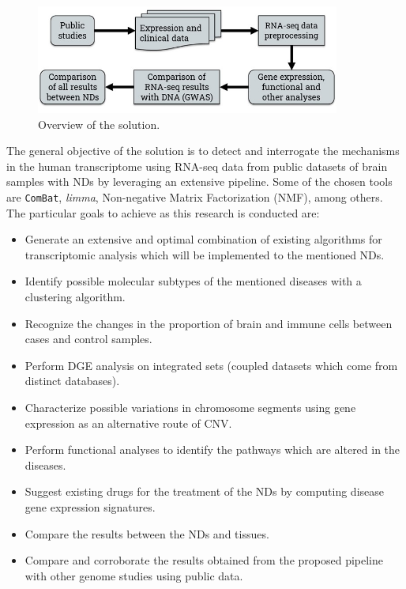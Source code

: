 \begin{figure}[h]
    \centerline{\includegraphics[width = 10cm]{Figures/overview.jpg}}
\caption{Overview of the solution.}
\label{fig:solution-overview}
\end{figure}

The general objective of the solution is to detect and interrogate the mechanisms in the human transcriptome using RNA-seq data from public datasets of brain samples with NDs by leveraging an extensive pipeline. Some of the chosen tools are \verb|ComBat|, \textit{limma}, Non-negative Matrix Factorization (NMF), among others. The particular goals to achieve as this research is conducted are:

\begin{itemize}
\item{Generate an extensive and optimal combination of existing algorithms for transcriptomic analysis which will be implemented to the mentioned NDs.}
\item{Identify possible molecular subtypes of the mentioned diseases with a clustering algorithm.}
\item{Recognize the changes in the proportion of brain and immune cells between cases and control samples.}
\item{Perform DGE analysis on integrated sets (coupled datasets which come from distinct databases).}
\item{Characterize possible variations in chromosome segments using gene expression as an alternative route of CNV.}
\item{Perform functional analyses to identify the pathways which are altered in the diseases.}
\item{Suggest existing drugs for the treatment of the NDs by computing disease gene expression signatures.}
\item{Compare the results between the NDs and tissues.}
\item{Compare and corroborate the results obtained from the proposed pipeline with other genome studies using public data.}
\end{itemize}


